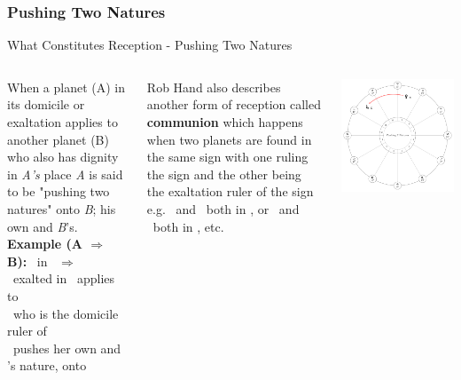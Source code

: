 \subsubsection{Pushing Two Natures}
\begin{frame}[t]{What Constitutes Reception - Pushing Two Natures}
\begin{columns}[T, onlytextwidth]
When a planet (A) in its domicile or exaltation applies to another planet (B) who also has dignity in \textsl{A's} place \textsl{A} is said to be "pushing two natures" onto \textsl{B}; his own and \textsl{B}'s.\footnotemark[1]\\
\vspace{0.2cm}
\textbf{Example (A $\Rightarrow$ B):} \Venus\ in \Pisces\ $\Rightarrow$ \Jupiter \\
\ul
\Venus\ exalted in \Pisces\ applies to \\
\Jupiter\ who is the domicile ruler of \Pisces \\
\Venus\ pushes her own and \Jupiter's nature, onto \Jupiter \\
\vspace{0.2cm}

Rob Hand also describes another form of reception called \textbf{communion} which happens when two planets are found in the same sign with one ruling the sign and the other being the exaltation ruler of the sign e.g. \Moon\ and \Jupiter\ both in \Cancer, or \Mars\ and \Sun\ both in \Aries, etc.

\vspace{-0.5cm}
\begin{center}
{\includegraphics[width=\textwidth]{charts/01-pushing-two-natures}} \\
\end{center}

\end{columns}
\end{frame}

